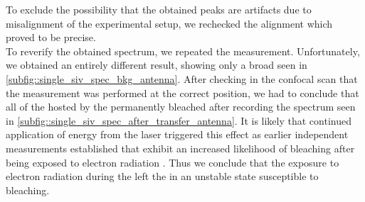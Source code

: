				To exclude the possibility that the obtained peaks are artifacts due to misalignment of the experimental setup, we rechecked the alignment which proved to be precise.
				\\
				To reverify the obtained spectrum, we repeated the measurement. Unfortunately, we obtained an entirely different result, showing only a broad \bkg seen in \autoref{subfig::single_siv_spec_bkg_antenna}. After checking in the confocal scan that the measurement was performed at the correct position, we had to conclude that all of the \sivs hosted by the \nd permanently bleached after recording the spectrum seen in \autoref{subfig::single_siv_spec_after_transfer_antenna}. It is likely that continued application of energy from the laser triggered this effect as earlier independent measurements established that \sivs exhibit an increased likelihood of bleaching after being exposed to electron radiation \cite{}. Thus we conclude that the exposure to electron radiation during the \pp left the \sivs in an unstable state susceptible to bleaching.

